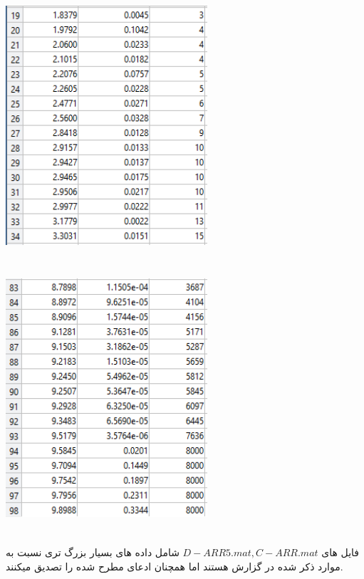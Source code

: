 \documentclass[12pt, letterpaper]{article}
\begin{document}
\includegraphics[height=10cm, width=75mm]{figure5.png}
\includegraphics[height=10cm, width=75mm]{figure6.png}

\vspace{10mm}
فایل های 
$ D-ARR5.mat , C-ARR.mat $
شامل داده های بسیار بزرگ تری نسبت به موارد ذکر شده در گزارش هستند اما همچنان ادعای مطرح شده را  تصدیق میکنند.
\vspace{10mm}
\\
\end{document}
